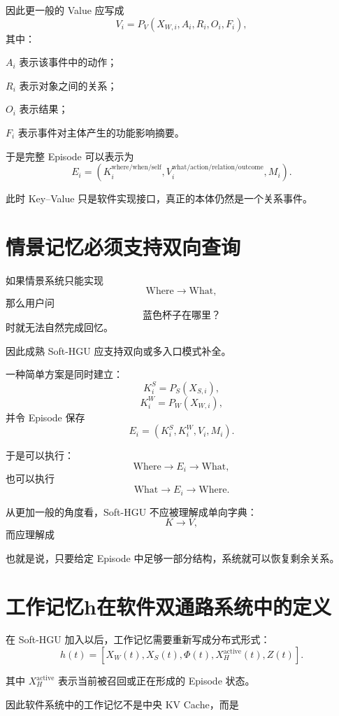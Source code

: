因此更一般的 Value 应写成
\[
\boxed{
V_i
=
P_V
(
X_{W,i},
A_i,
R_i,
O_i,
F_i
),
}
\]
其中：

$A_i$ 表示该事件中的动作；

$R_i$ 表示对象之间的关系；

$O_i$ 表示结果；

$F_i$ 表示事件对主体产生的功能影响摘要。

于是完整 Episode 可以表示为
\[
\boxed{
E_i
=
(
K_i^{\mathrm{where/when/self}},
V_i^{\mathrm{what/action/relation/outcome}},
M_i
).
}
\]

此时 Key--Value 只是软件实现接口，真正的本体仍然是一个关系事件。

\section{情景记忆必须支持双向查询}

如果情景系统只能实现
\[
\mathrm{Where}\rightarrow\mathrm{What},
\]
那么用户问
\[
\text{蓝色杯子在哪里？}
\]
时就无法自然完成回忆。

因此成熟 Soft-HGU 应支持双向或多入口模式补全。

一种简单方案是同时建立：
\[
K_i^S=P_S(X_{S,i}),
\]
\[
K_i^W=P_W(X_{W,i}),
\]
并令 Episode 保存
\[
E_i
=
(
K_i^S,
K_i^W,
V_i,
M_i
).
\]

于是可以执行：
\[
\mathrm{Where}
\rightarrow
E_i
\rightarrow
\mathrm{What},
\]
也可以执行
\[
\mathrm{What}
\rightarrow
E_i
\rightarrow
\mathrm{Where}.
\]

从更加一般的角度看，Soft-HGU 不应被理解成单向字典：
\[
K\rightarrow V,
\]
而应理解成
\begin{statementbox}
\centering
{}
\end{statementbox}

也就是说，只要给定 Episode 中足够一部分结构，系统就可以恢复剩余关系。

\section{工作记忆h在软件双通路系统中的定义}

在 Soft-HGU 加入以后，工作记忆需要重新写成分布式形式：
\[
\boxed{
h(t)
=
[
X_W(t),
X_S(t),
\Phi(t),
X_H^{\mathrm{active}}(t),
Z(t)
].
}
\]

其中 $X_H^{\mathrm{active}}$ 表示当前被召回或正在形成的 Episode 状态。

因此软件系统中的工作记忆不是中央 KV Cache，而是
\begin{statementbox}
\centering
{}
\end{statementbox}

